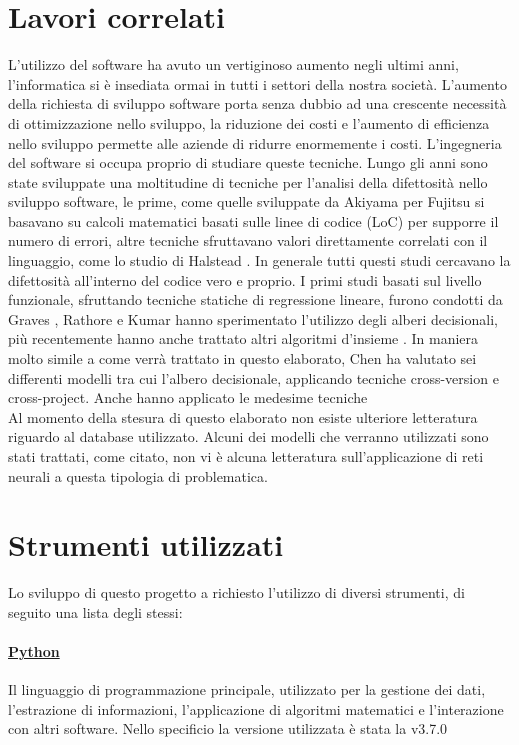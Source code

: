 \documentclass[%
    corpo=12pt,
    twoside,
    oldstyle,
    autoretitolo,
    greek,
    evenboxes,
]{toptesi}
\begin{document}
\section{Lavori correlati}
L'utilizzo del software ha avuto un vertiginoso aumento negli ultimi anni, l'informatica si è insediata ormai in tutti i settori della nostra società. L'aumento della richiesta di sviluppo software porta senza dubbio ad una crescente necessità di ottimizzazione nello sviluppo, la riduzione dei costi e l'aumento di efficienza nello sviluppo permette alle aziende di ridurre enormemente i costi. L'ingegneria del software si occupa proprio di studiare queste tecniche. Lungo gli anni sono state sviluppate una moltitudine di tecniche per l'analisi della difettosità nello sviluppo software, le prime, come quelle sviluppate da Akiyama per Fujitsu \cite{Akiyama1971AnEO} si basavano su calcoli matematici basati sulle linee di codice (LoC) per supporre il numero di errori, altre tecniche sfruttavano valori direttamente correlati con il linguaggio, come lo studio di Halstead \cite{halstead1977elements}. In generale tutti questi studi cercavano la difettosità all'interno del codice vero e proprio. I primi studi basati sul livello funzionale, sfruttando tecniche statiche di regressione lineare, furono condotti da Graves \cite{graves_se}, Rathore e Kumar \cite{santosh_se} hanno sperimentato l'utilizzo degli alberi decisionali, più recentemente hanno anche trattato altri algoritmi d'insieme \cite{rathore}. In maniera molto simile a come verrà trattato in questo elaborato, Chen \cite{Chen} ha valutato sei differenti modelli tra cui l'albero decisionale, applicando tecniche cross-version e cross-project. Anche \cite{super_unsuper} hanno applicato le medesime tecniche\\
Al momento della stesura di questo elaborato non esiste ulteriore letteratura riguardo al database utilizzato. Alcuni dei modelli che verranno utilizzati sono stati trattati, come citato, non vi è alcuna letteratura sull'applicazione di reti neurali a questa tipologia di problematica.

\section{Strumenti utilizzati}
Lo sviluppo di questo progetto a richiesto l'utilizzo di diversi strumenti, di seguito una lista degli stessi:

\paragraph{\href{https://www.python.org/}{Python}} Il linguaggio di programmazione principale, utilizzato per la gestione dei dati, l'estrazione di informazioni, l'applicazione di algoritmi matematici e l'interazione con altri software. Nello specificio la versione utilizzata è stata la v3.7.0
\end{document}
